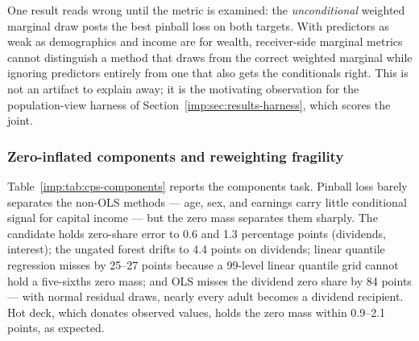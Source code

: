 One result reads wrong until the metric is examined: the \emph{unconditional}
weighted marginal draw posts the best pinball loss on both targets. With
predictors as weak as demographics and income are for wealth, receiver-side
marginal metrics cannot distinguish a method that draws from the correct
weighted marginal while ignoring predictors entirely from one that also gets
the conditionals right. This is not an artifact to explain away; it is the
motivating observation for the population-view harness of
Section~\ref{imp:sec:results-harness}, which scores the joint.

\subsubsection{Zero-inflated components and reweighting fragility}
\label{imp:sec:results-cps}

\begin{table}[t]
\centering
\footnotesize
\resizebox{\textwidth}{!}{}
\caption{Zero-inflated income components in the raw \cps{} (interest and
dividend income for adults): weighted pinball loss and zero-share error, mean
(sd) over ten paired seeds.}
\label{imp:tab:cps-components}
\end{table}

\begin{table}[t]
\centering
\footnotesize
\resizebox{\textwidth}{!}{}
\caption{Reweighting fragility at $\kappa=5$: worst-case single-record share
of each component's aggregate over bounded multiplicative reweightings, next
to the held-out truth's own fragility. The target is the truth's exposure ---
bold marks the closest method; substantially lower means the method fails to
generate realistic tails, substantially higher means it plants landmines.}
\label{imp:tab:fragility}
\end{table}

Table~\ref{imp:tab:cps-components} reports the \cps{} components task. Pinball
loss barely separates the non-OLS methods --- age, sex, and earnings carry
little conditional signal for capital income --- but the zero mass separates
them sharply. The candidate holds zero-share error to 0.6 and 1.3 percentage
points (dividends, interest); the ungated forest drifts to 4.4 points on
dividends; linear quantile regression misses by 25--27 points because a
99-level linear quantile grid cannot hold a five-sixths zero mass; and OLS
misses the dividend zero share by 84 points --- with normal residual draws,
nearly every adult becomes a dividend recipient. Hot deck, which donates
observed values, holds the zero mass within 0.9--2.1 points, as expected.


